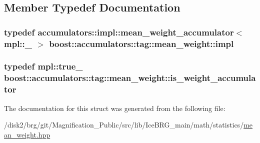 \subsection{Member Typedef Documentation}
\hypertarget{structboost_1_1accumulators_1_1tag_1_1mean__weight_a050aa975e9ff22bae68cb1b2d2ccb5d8}{
\subsubsection[{impl}]{\setlength{\rightskip}{0pt plus 5cm}typedef {\bf accumulators\-::impl\-::mean\-\_\-weight\-\_\-accumulator}$<$ mpl\-::\-\_ $>$ {\bf boost\-::accumulators\-::tag\-::mean\-\_\-weight\-::impl}}}\label{structboost_1_1accumulators_1_1tag_1_1mean__weight_a050aa975e9ff22bae68cb1b2d2ccb5d8}
\hypertarget{structboost_1_1accumulators_1_1tag_1_1mean__weight_a0eb6a612218600bcc4fd32f08cf9cc70}{
\subsubsection[{is\-\_\-weight\-\_\-accumulator}]{\setlength{\rightskip}{0pt plus 5cm}typedef mpl\-::true\-\_\- {\bf boost\-::accumulators\-::tag\-::mean\-\_\-weight\-::is\-\_\-weight\-\_\-accumulator}}}\label{structboost_1_1accumulators_1_1tag_1_1mean__weight_a0eb6a612218600bcc4fd32f08cf9cc70}


The documentation for this struct was generated from the following file\-:\begin{DoxyCompactItemize}
\item 
/disk2/brg/git/\-Magnification\-\_\-\-Public/src/lib/\-Ice\-B\-R\-G\-\_\-main/math/statistics/\hyperlink{mean__weight_8hpp}{mean\-\_\-weight.\-hpp}\end{DoxyCompactItemize}
